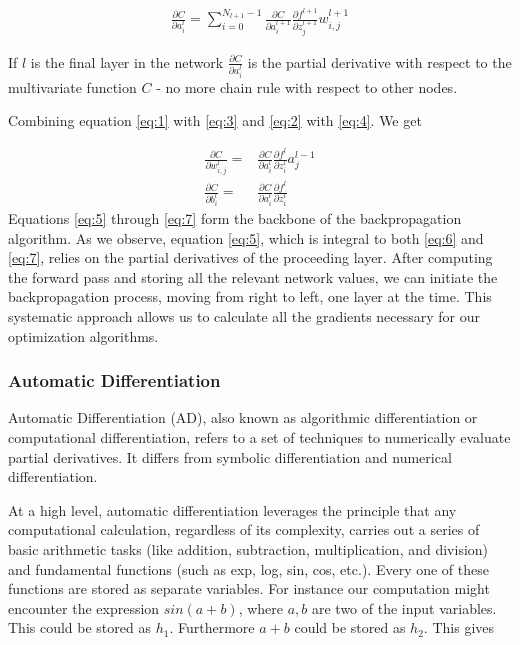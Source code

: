\documentclass{article}
\theoremstyle{definition}
\begin{document}
\begin{align}
    \frac{\partial C}{\partial a_i^l} =  \sum_{i=0}^{N_{l+1}-1} \frac{\partial C}{\partial a_i^{l+1}} \frac{\partial f^{l+1}}{\partial z_j^{l+1}} w_{i,j}^{l+1} \label{eq:5} 
\end{align}


If $l$ is the final layer in the network $\frac{\partial C}{\partial a_i^l}$ is the partial derivative with respect to the multivariate function $C$ - no more chain rule with respect to other nodes.

Combining equation \eqref{eq:1} with \eqref{eq:3} and \eqref{eq:2} with \eqref{eq:4}. We get

\begin{align}
     \frac{\partial C}{\partial w_{i,j}^l} =& \frac{\partial C}{\partial a_i^l} \frac{\partial f^l}{\partial z_i^l} a_j^{l-1}\label{eq:6} 
    \\
    \frac{\partial C}{\partial b_i^l} = & \frac{\partial C}{\partial a_i^l} \frac{\partial f^l}{\partial z_i^l} \label{eq:7} 
\end{align}
Equations \eqref{eq:5} through \eqref{eq:7} form the backbone of the backpropagation algorithm. As we observe, equation \eqref{eq:5}, which is integral to both \eqref{eq:6} and \eqref{eq:7}, relies on the partial derivatives of the proceeding layer. After computing the forward pass and storing all the relevant network values, we can initiate the backpropagation process, moving from right to left, one layer at the time. This systematic approach allows us to calculate all the gradients necessary for our optimization algorithms.


\subsubsection{Automatic Differentiation}
Automatic Differentiation (AD), also known as algorithmic differentiation or computational differentiation, refers to a set of techniques to numerically evaluate partial derivatives. It differs from symbolic differentiation and numerical differentiation.

At a high level, automatic differentiation leverages the principle that any computational calculation, regardless of its complexity, carries out a series of basic arithmetic tasks (like addition, subtraction, multiplication, and division) and fundamental functions (such as exp, log, sin, cos, etc.). Every one of these functions are stored as separate variables. For instance our computation might encounter the expression $sin(a+b)$, where $a,b$ are two of the input variables. This could be stored as $h_1$. Furthermore $a+b$ could be stored as $h_2$. This gives 
\end{document}
